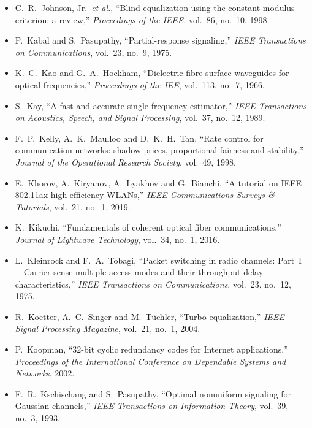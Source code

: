 \begin{itemize}[leftmargin=1.5em,itemindent=-1.5em,itemsep=1.5pt plus 1pt,parsep=0pt,topsep=4pt,label={}]
\item C.~R.~Johnson, Jr.\ \emph{et al.}, ``Blind equalization using the constant modulus criterion: a review,'' \emph{Proceedings of the IEEE}, vol.~86, no.~10, 1998.
\item P.~Kabal and S.~Pasupathy, ``Partial-response signaling,'' \emph{IEEE Transactions on Communications}, vol.~23, no.~9, 1975.
\item K.~C.~Kao and G.~A.~Hockham, ``Dielectric-fibre surface waveguides for optical frequencies,'' \emph{Proceedings of the IEE}, vol.~113, no.~7, 1966.
\item S.~Kay, ``A fast and accurate single frequency estimator,'' \emph{IEEE Transactions on Acoustics, Speech, and Signal Processing}, vol.~37, no.~12, 1989.
\item F.~P.~Kelly, A.~K.~Maulloo and D.~K.~H.~Tan, ``Rate control for communication networks: shadow prices, proportional fairness and stability,'' \emph{Journal of the Operational Research Society}, vol.~49, 1998.
\item E.~Khorov, A.~Kiryanov, A.~Lyakhov and G.~Bianchi, ``A tutorial on IEEE 802.11ax high efficiency WLANs,'' \emph{IEEE Communications Surveys \& Tutorials}, vol.~21, no.~1, 2019.
\item K.~Kikuchi, ``Fundamentals of coherent optical fiber communications,'' \emph{Journal of Lightwave Technology}, vol.~34, no.~1, 2016.
\item L.~Kleinrock and F.~A.~Tobagi, ``Packet switching in radio channels: Part~I---Carrier sense multiple-access modes and their throughput-delay characteristics,'' \emph{IEEE Transactions on Communications}, vol.~23, no.~12, 1975.
\item R.~Koetter, A.~C.~Singer and M.~T\"uchler, ``Turbo equalization,'' \emph{IEEE Signal Processing Magazine}, vol.~21, no.~1, 2004.
\item P.~Koopman, ``32-bit cyclic redundancy codes for Internet applications,'' \emph{Proceedings of the International Conference on Dependable Systems and Networks}, 2002.
\item F.~R.~Kschischang and S.~Pasupathy, ``Optimal nonuniform signaling for Gaussian channels,'' \emph{IEEE Transactions on Information Theory}, vol.~39, no.~3, 1993.

\end{itemize}
